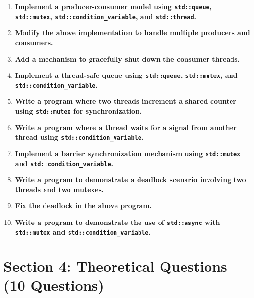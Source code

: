 \documentclass[12pt]{article}
\begin{document}
\begin{enumerate}
    \item \textbf{Implement a producer-consumer model using \texttt{std::queue}, \texttt{std::mutex}, \texttt{std::condition\_variable}, and \texttt{std::thread}.}

    \item \textbf{Modify the above implementation to handle multiple producers and consumers.}

    \item \textbf{Add a mechanism to gracefully shut down the consumer threads.}

    \item \textbf{Implement a thread-safe queue using \texttt{std::queue}, \texttt{std::mutex}, and \texttt{std::condition\_variable}.}

    \item \textbf{Write a program where two threads increment a shared counter using \texttt{std::mutex} for synchronization.}

    \item \textbf{Write a program where a thread waits for a signal from another thread using \texttt{std::condition\_variable}.}

    \item \textbf{Implement a barrier synchronization mechanism using \texttt{std::mutex} and \texttt{std::condition\_variable}.}

    \item \textbf{Write a program to demonstrate a deadlock scenario involving two threads and two mutexes.}

    \item \textbf{Fix the deadlock in the above program.}

    \item \textbf{Write a program to demonstrate the use of \texttt{std::async} with \texttt{std::mutex} and \texttt{std::condition\_variable}.}
\end{enumerate}

\section*{Section 4: Theoretical Questions (10 Questions)}
\end{document}
